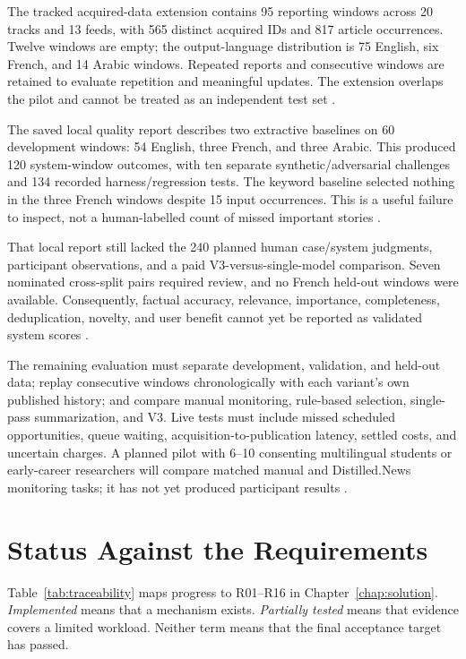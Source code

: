 The tracked acquired-data extension contains 95 reporting windows across 20 tracks and 13 feeds, with 565 distinct acquired IDs and 817 article occurrences. Twelve windows are empty; the output-language distribution is 75 English, six French, and 14 Arabic windows. Repeated reports and consecutive windows are retained to evaluate repetition and meaningful updates. The extension overlaps the pilot and cannot be treated as an independent test set \cite{dataaudit}.

The saved local quality report describes two extractive baselines on 60 development windows: 54 English, three French, and three Arabic. This produced 120 system-window outcomes, with ten separate synthetic/adversarial challenges and 134 recorded harness/regression tests. The keyword baseline selected nothing in the three French windows despite 15 input occurrences. This is a useful failure to inspect, not a human-labelled count of missed important stories \cite{localquality}.

That local report still lacked the 240 planned human case/system judgments, participant observations, and a paid V3-versus-single-model comparison. Seven nominated cross-split pairs required review, and no French held-out windows were available. Consequently, factual accuracy, relevance, importance, completeness, deduplication, novelty, and user benefit cannot yet be reported as validated system scores \cite{localquality}.

The remaining evaluation must separate development, validation, and held-out data; replay consecutive windows chronologically with each variant's own published history; and compare manual monitoring, rule-based selection, single-pass summarization, and V3. Live tests must include missed scheduled opportunities, queue waiting, acquisition-to-publication latency, settled costs, and uncertain charges. A planned pilot with 6--10 consenting multilingual students or early-career researchers will compare matched manual and Distilled.News monitoring tasks; it has not yet produced participant results \cite{performanceprotocol,validationplan}.

\section{Status Against the Requirements}

Table~\ref{tab:traceability} maps progress to R01--R16 in Chapter~\ref{chap:solution}. \emph{Implemented} means that a mechanism exists. \emph{Partially tested} means that evidence covers a limited workload. Neither term means that the final acceptance target has passed.


